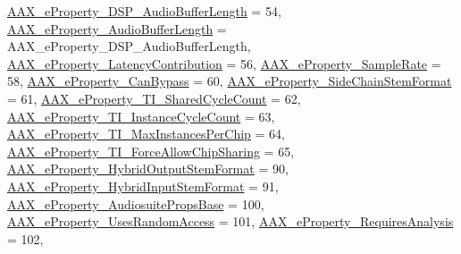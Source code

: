 \begin{DoxyCompactItemize}
\mbox{\hyperlink{a00662_a13e384f22825afd3db6d68395b79ce0da09fbd1cbcae0e86ad81005258dc1b67e}{A\+A\+X\+\_\+e\+Property\+\_\+\+D\+S\+P\+\_\+\+Audio\+Buffer\+Length}} = 54, 
\mbox{\hyperlink{a00662_a13e384f22825afd3db6d68395b79ce0da34b1ae8c8edd3080aee6cd677bed9611}{A\+A\+X\+\_\+e\+Property\+\_\+\+Audio\+Buffer\+Length}} = A\+A\+X\+\_\+e\+Property\+\_\+\+D\+S\+P\+\_\+\+Audio\+Buffer\+Length, 
\mbox{\hyperlink{a00662_a13e384f22825afd3db6d68395b79ce0daa9037ffd2caf892bafe8f7f170548cb4}{A\+A\+X\+\_\+e\+Property\+\_\+\+Latency\+Contribution}} = 56, 
\newline
\mbox{\hyperlink{a00662_a13e384f22825afd3db6d68395b79ce0dac5294e2feb18587d57b6ca0216a6bb1e}{A\+A\+X\+\_\+e\+Property\+\_\+\+Sample\+Rate}} = 58, 
\mbox{\hyperlink{a00662_a13e384f22825afd3db6d68395b79ce0da6819867a9e86913e59decf318416d755}{A\+A\+X\+\_\+e\+Property\+\_\+\+Can\+Bypass}} = 60, 
\mbox{\hyperlink{a00662_a13e384f22825afd3db6d68395b79ce0dae71ad10ce55fb8c4076fe70315b689ae}{A\+A\+X\+\_\+e\+Property\+\_\+\+Side\+Chain\+Stem\+Format}} = 61, 
\mbox{\hyperlink{a00662_a13e384f22825afd3db6d68395b79ce0da3e5b289333ba49f5a33de40d89fa4ade}{A\+A\+X\+\_\+e\+Property\+\_\+\+T\+I\+\_\+\+Shared\+Cycle\+Count}} = 62, 
\newline
\mbox{\hyperlink{a00662_a13e384f22825afd3db6d68395b79ce0da5d8e5be9f3698a9c67a578c29da66405}{A\+A\+X\+\_\+e\+Property\+\_\+\+T\+I\+\_\+\+Instance\+Cycle\+Count}} = 63, 
\mbox{\hyperlink{a00662_a13e384f22825afd3db6d68395b79ce0da5b85e213113b7f0f7ee4bac4f5eaa59d}{A\+A\+X\+\_\+e\+Property\+\_\+\+T\+I\+\_\+\+Max\+Instances\+Per\+Chip}} = 64, 
\mbox{\hyperlink{a00662_a13e384f22825afd3db6d68395b79ce0da2f040408f0cc8d72f8069db8b3192ee7}{A\+A\+X\+\_\+e\+Property\+\_\+\+T\+I\+\_\+\+Force\+Allow\+Chip\+Sharing}} = 65, 
\mbox{\hyperlink{a00805_ga13e384f22825afd3db6d68395b79ce0dac30a4e73772e37267dfef39ae3122705}{A\+A\+X\+\_\+e\+Property\+\_\+\+Hybrid\+Output\+Stem\+Format}} = 90, 
\newline
\mbox{\hyperlink{a00805_ga13e384f22825afd3db6d68395b79ce0da33a950bc2e02d38fc3be0a0ad8cc89b1}{A\+A\+X\+\_\+e\+Property\+\_\+\+Hybrid\+Input\+Stem\+Format}} = 91, 
\mbox{\hyperlink{a00662_a13e384f22825afd3db6d68395b79ce0dae774ad8d49f9d021fc39e7d9c6f08070}{A\+A\+X\+\_\+e\+Property\+\_\+\+Audiosuite\+Props\+Base}} = 100, 
\mbox{\hyperlink{a00662_a13e384f22825afd3db6d68395b79ce0dab0bbaabe0a03b37e5a69f04a6f306076}{A\+A\+X\+\_\+e\+Property\+\_\+\+Uses\+Random\+Access}} = 101, 
\mbox{\hyperlink{a00662_a13e384f22825afd3db6d68395b79ce0da925c49bb79454b33bf1d5f4cb09d373f}{A\+A\+X\+\_\+e\+Property\+\_\+\+Requires\+Analysis}} = 102, 

\end{DoxyCompactItemize}
